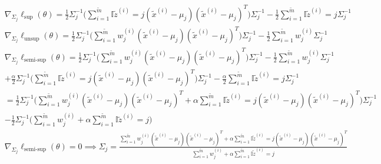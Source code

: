 \documentclass{article}
\begin{document}
\begin{align*}
    & \nabla_{\Sigma_{j}}\ell_{\text{sup}}(\theta)=\frac{1}{2}\Sigma_{j}^{-1}\Big(\sum_{i=1}^{\tilde{m}}\mathbb{I}{\tilde{z}^{(i)}=j}(\tilde{x}^{(i)}-\mu_{j})(\tilde{x}^{(i)}-\mu_{j})^{T}\Big)\Sigma_{j}^{-1}-\frac{1}{2}\sum_{i=1}^{\tilde{m}}\mathbb{I}{\tilde{z}^{(i)}=j}\Sigma_{j}^{-1}                                                                                           \\
    & \nabla_{\Sigma_{j}}\ell_{\text{unsup}}(\theta)=\frac{1}{2}\Sigma_{j}^{-1}\Big(\sum_{i=1}^{\tilde{m}}w_{j}^{(i)}(\tilde{x}^{(i)}-\mu_{j})(\tilde{x}^{(i)}-\mu_{j})^{T}\Big)\Sigma_{j}^{-1}-\frac{1}{2}\sum_{i=1}^{\tilde{m}}w_{j}^{(i)}\Sigma_{j}^{-1}                                                                                                                             \\
    & \nabla_{\Sigma_{j}}\ell_{\text{semi-sup}}(\theta)=\frac{1}{2}\Sigma_{j}^{-1}\Big(\sum_{i=1}^{\tilde{m}}w_{j}^{(i)}(\tilde{x}^{(i)}-\mu_{j})(\tilde{x}^{(i)}-\mu_{j})^{T}\Big)\Sigma_{j}^{-1}-\frac{1}{2}\sum_{i=1}^{\tilde{m}}w_{j}^{(i)}\Sigma_{j}^{-1}                                                                                                                          \\
    & +\frac{\alpha}{2}\Sigma_{j}^{-1}\Big(\sum_{i=1}^{\tilde{m}}\mathbb{I}{\tilde{z}^{(i)}=j}(\tilde{x}^{(i)}-\mu_{j})(\tilde{x}^{(i)}-\mu_{j})^{T}\Big)\Sigma_{j}^{-1}-\frac{\alpha}{2}\sum_{i=1}^{\tilde{m}}\mathbb{I}{\tilde{z}^{(i)}=j}\Sigma_{j}^{-1}                                                                                                                             \\
    & =\frac{1}{2}\Sigma_{j}^{-1}\Big(\sum_{i=1}^{\tilde{m}}w_{j}^{(i)}(\tilde{x}^{(i)}-\mu_{j})(\tilde{x}^{(i)}-\mu_{j})^{T}+\alpha\sum_{i=1}^{\tilde{m}}\mathbb{I}{\tilde{z}^{(i)}=j}(\tilde{x}^{(i)}-\mu_{j})(\tilde{x}^{(i)}-\mu_{j})^{T}\Big)\Sigma_{j}^{-1}                                                                                                                       \\
    & -\frac{1}{2}\Sigma_{j}^{-1}\Big(\sum_{i=1}^{\tilde{m}}w_{j}^{(i)}+\alpha\sum_{i=1}^{\tilde{m}}\mathbb{I}{\tilde{z}^{(i)}=j}\Big)                                                                                                                                                                                                                                                  \\
    & \nabla_{\Sigma_{j}}\ell_{\text{semi-sup}}(\theta)=0\implies\Sigma_{j}=\frac{\sum_{i=1}^{\tilde{m}}w_{j}^{(i)}(\tilde{x}^{(i)}-\mu_{j})(\tilde{x}^{(i)}-\mu_{j})^{T}+\alpha\sum_{i=1}^{\tilde{m}}\mathbb{I}{\tilde{z}^{(i)}=j}(\tilde{x}^{(i)}-\mu_{j})(\tilde{x}^{(i)}-\mu_{j})^{T}}{\sum_{i=1}^{\tilde{m}}w_{j}^{(i)}+\alpha\sum_{i=1}^{\tilde{m}}\mathbb{I}{\tilde{z}^{(i)}=j}}
\end{align*}
\end{document}

